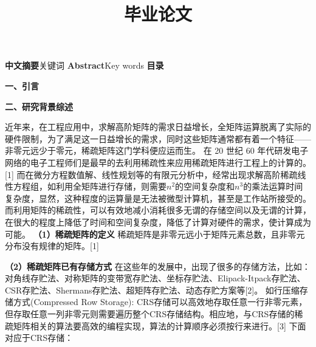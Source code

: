\documentclass{article}
\begin{document}
  

\title{毕业论文}
\date{}

\maketitle


\textbf{中文摘要}关键词
      \qquad
\newline
\textbf{Abstract}Key words
      \qquad
\newline
\textbf{目录}
      \qquad
\newline

\textbf{一、引言}
      \qquad
\newline

\textbf{二、研究背景综述}
      \qquad
\newline

近年来，在工程应用中，求解高阶矩阵的需求日益增长，全矩阵运算脱离了实际的硬件限制，为了满足这一日益增长的需求，同时这些矩阵通常都有着一个特征——非零元远少于零元，稀疏矩阵这门学科便应运而生。
在 20 世纪 60 年代研发电子网络的电子工程师们是最早的去利用稀疏性来应用稀疏矩阵进行工程上的计算的。[1]
而在微分方程数值解、线性规划等的有限元分析中，经常出现求解高阶稀疏线性方程组，如利用全矩阵进行存储，则需要$n^2$的空间复杂度和$n^3$的乘法运算时间复杂度，显然，这种程度的运算量是无法被微型计算机，甚至是工作站所接受的。
而利用矩阵的稀疏性，可以有效地减小消耗很多无谓的存储空间以及无谓的计算，在很大的程度上降低了时间和空间复杂度，降低了计算对硬件的需求，使计算成为可能。
\newline
\textbf{（1）稀疏矩阵的定义}
      \qquad
\newline
稀疏矩阵是非零元远小于矩阵元素总数，且非零元分布没有规律的矩阵。[1]

\textbf{（2）稀疏矩阵已有存储方式}
      \qquad
\newline
在这些年的发展中，出现了很多的存储方法，比如：对角线存贮法、对称矩阵的变带宽存贮法、坐标存贮法、Elipack-Itpack存贮法、CSR存贮法、Shermans存贮法、超矩阵存贮法、动态存贮方案等[2]。
\newline
如行压缩存储方式(Compressed Row Storage):
CRS存储可以高效地存取任意一行非零元素，但存取任意一列非零元则需要遍历整个CRS存储结构。相应地，与CRS存储的稀疏矩阵相关的算法要高效的编程实现，算法的计算顺序必须按行来进行。[3]
下面对应于CRS存储：
\newline\newline\newline\newline\newline\newline\newline
\end{document}
